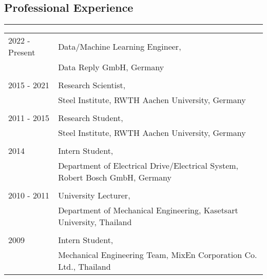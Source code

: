 \subsection*{Professional Experience}
\hrule
\vspace*{0.1cm}
\begin{tabular}{l l}
    
    2022 - Present  & Data/Machine Learning Engineer,\\
    \hspace*{2.5cm}                & Data Reply GmbH, Germany\\
                    \\
    2015 - 2021     & Research Scientist,\\
                    & Steel Institute, RWTH Aachen University, Germany\\
                    \\
    2011 - 2015     & Research Student,\\
                    & Steel Institute, RWTH Aachen University, Germany\\
                    \\
    2014            & Intern Student,\\
                    & Department of Electrical Drive/Electrical System, Robert Bosch GmbH, Germany\\
                    \\  
    2010 - 2011     & University Lecturer,\\
                    & Department of Mechanical Engineering, Kasetsart University, Thailand\\
                    \\
    2009            & Intern Student,\\
                    & Mechanical Engineering Team, MixEn Corporation Co. Ltd., Thailand\\
    
\end{tabular}

